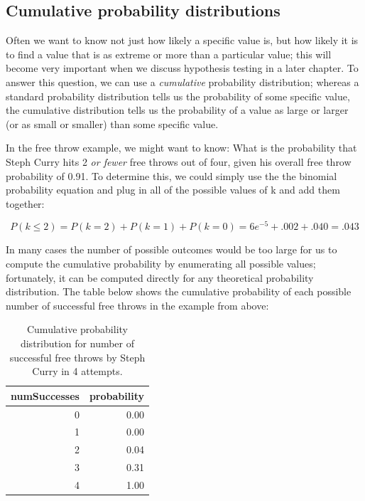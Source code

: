 \documentclass[12pt,]{book}
\theoremstyle{definition}
\theoremstyle{definition}
\theoremstyle{definition}
\theoremstyle{remark}
\begin{document}
\hypertarget{cumulative-probability-distributions}{%
\subsection{Cumulative probability distributions}\label{cumulative-probability-distributions}}

Often we want to know not just how likely a specific value is, but how likely it is to find a value that is as extreme or more than a particular value; this will become very important when we discuss hypothesis testing in a later chapter. To answer this question, we can use a \emph{cumulative} probability distribution; whereas a standard probability distribution tells us the probability of some specific value, the cumulative distribution tells us the probability of a value as large or larger (or as small or smaller) than some specific value.

In the free throw example, we might want to know: What is the probability that Steph Curry hits 2 \emph{or fewer} free throws out of four, given his overall free throw probability of 0.91. To determine this, we could simply use the the binomial probability equation and plug in all of the possible values of k and add them together:

\[
P(k\le2)= P(k=2) + P(k=1) + P(k=0) = 6e^{-5} + .002 + .040 = .043  
\]

In many cases the number of possible outcomes would be too large for us to compute the cumulative probability by enumerating all possible values; fortunately, it can be computed directly for any theoretical probability distribution. The table below shows the cumulative probability of each possible number of successful free throws in the example from above:

\begin{table}

\caption{\label{tab:unnamed-chunk-25}Cumulative probability distribution for number of successful free throws by Steph Curry in 4 attempts.}
\centering
\begin{tabular}[t]{r|r}
\hline
numSuccesses & probability\\
\hline
0 & 0.00\\
\hline
1 & 0.00\\
\hline
2 & 0.04\\
\hline
3 & 0.31\\
\hline
4 & 1.00\\
\hline
\end{tabular}
\end{table}
\end{document}
